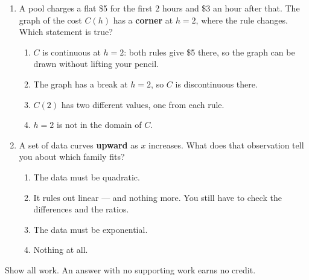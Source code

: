 \begin{enumerate}[leftmargin=1.8em, itemsep=6pt, topsep=5pt]
\item A pool charges a flat \$5 for the first $2$ hours and \$3 an hour after that. The graph of
the cost $C(h)$ has a \textbf{corner} at $h=2$, where the rule changes. Which statement is true?
\begin{enumerate}[label=(\Alph*), leftmargin=2.2em, itemsep=1pt, topsep=2pt]
  \item $C$ is continuous at $h=2$: both rules give \$5 there, so the graph can be drawn without
        lifting your pencil.
  \item The graph has a break at $h=2$, so $C$ is discontinuous there.
  \item $C(2)$ has two different values, one from each rule.
  \item $h=2$ is not in the domain of $C$.
\end{enumerate}

\item A set of data curves \textbf{upward} as $x$ increases. What does that observation tell you
about which family fits?
\begin{enumerate}[label=(\Alph*), leftmargin=2.2em, itemsep=1pt, topsep=2pt]
  \item The data must be quadratic.
  \item It rules out linear --- and nothing more. You still have to check the differences and the
        ratios.
  \item The data must be exponential.
  \item Nothing at all.
\end{enumerate}

\end{enumerate}


\noindent\small Show all work. An answer with no supporting work earns no credit.

